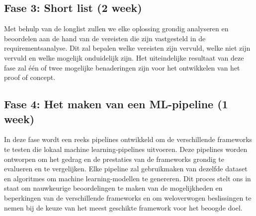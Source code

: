 \subsection{Fase 3: Short list (2 week)}
Met behulp van de longlist zullen we elke oplossing grondig analyseren en beoordelen aan de hand van de vereisten die zijn vastgesteld in de requirementsanalyse. Dit zal bepalen welke vereisten zijn vervuld, welke niet zijn vervuld en welke mogelijk onduidelijk zijn. Het uiteindelijke resultaat van deze fase zal één of twee mogelijke benaderingen zijn voor het ontwikkelen van het proof of concept.
\subsection{Fase 4: Het maken van een ML-pipeline (1 week)}
In deze fase wordt een reeks pipelines ontwikkeld om de verschillende frameworks te testen die lokaal machine learning-pipelines uitvoeren. Deze pipelines worden ontworpen om het gedrag en de prestaties van de frameworks grondig te evalueren en te vergelijken. Elke pipeline zal gebruikmaken van dezelfde dataset en algoritmes om machine learning-modellen te genereren. Dit proces stelt ons in staat om nauwkeurige beoordelingen te maken van de mogelijkheden en beperkingen van de verschillende frameworks en om weloverwogen beslissingen te nemen bij de keuze van het meest geschikte framework voor het beoogde doel.
